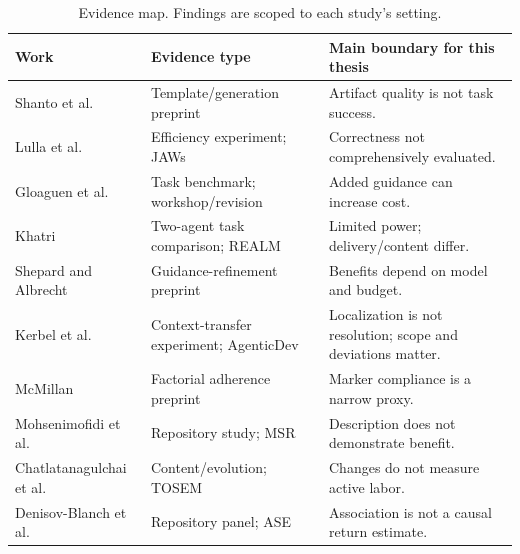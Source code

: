 \begin{table}[htbp]
\centering\small
\caption{Evidence map. Findings are scoped to each study's setting.}
\label{tab:evidence}
\begin{tabularx}{\textwidth}{@{}p{}Y Y@{}}
\toprule
Work & Evidence type & Main boundary for this thesis \\
\midrule
Shanto et al. & Template/generation preprint & Artifact quality is not task success. \\
\addlinespace
Lulla et al. & Efficiency experiment; JAWs & Correctness not comprehensively evaluated. \\
\addlinespace
Gloaguen et al. & Task benchmark; workshop/revision & Added guidance can increase cost. \\
\addlinespace
Khatri & Two-agent task comparison; REALM & Limited power; delivery/content differ. \\
\addlinespace
Shepard and Albrecht & Guidance-refinement preprint & Benefits depend on model and budget. \\
\addlinespace
Kerbel et al. & Context-transfer experiment; AgenticDev & Localization is not resolution; scope and deviations matter. \\
\addlinespace
McMillan & Factorial adherence preprint & Marker compliance is a narrow proxy. \\
\addlinespace
Mohsenimofidi et al. & Repository study; MSR & Description does not demonstrate benefit. \\
\addlinespace
Chatlatanagulchai et al. & Content/evolution; TOSEM & Changes do not measure active labor. \\
\addlinespace
Denisov-Blanch et al. & Repository panel; ASE & Association is not a causal return estimate. \\
\bottomrule
\end{tabularx}
\end{table}

